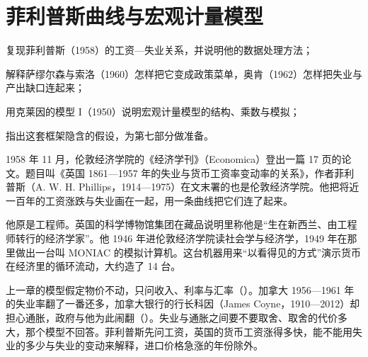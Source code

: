 \chapter{菲利普斯曲线与宏观计量模型}\label{ch:phillips}

\begin{chapterguide}
\begin{guidegoals}
\item 复现菲利普斯（1958）的工资—失业关系，并说明他的数据处理方法；
\item 解释萨缪尔森与索洛（1960）怎样把它变成政策菜单，奥肯（1962）怎样把失业与产出缺口连起来；
\item 用克莱因的模型 I（1950）说明宏观计量模型的结构、乘数与模拟；
\item 指出这套框架隐含的假设，为第七部分做准备。
\end{guidegoals}
\end{chapterguide}

1958 年 11 月，伦敦经济学院的《经济学刊》（Economica）登出一篇 17 页的论文\cite{phillips1958}。题目叫《英国 1861—1957 年的失业与货币工资率变动率的关系》，作者菲利普斯（A. W. H. Phillips，1914—1975）在文末署的也是伦敦经济学院\cite{phillips1958,loc38}。他把将近一百年的工资涨跌与失业画在一起，用一条曲线把它们连了起来\cite{phillips1958}。

他原是工程师。英国的科学博物馆集团在藏品说明里称他是“生在新西兰、由工程师转行的经济学家”\cite{smg38}。他 1946 年进伦敦经济学院读社会学与经济学，1949 年在那里做出一台叫 MONIAC 的模拟计算机\cite{smg38}。这台机器用来“以看得见的方式”演示货币在经济里的循环流动，大约造了 14 台\cite{smg38}。

上一章的模型假定物价不动，只问收入、利率与汇率（）。加拿大 1956—1961 年的失业率翻了一番还多，加拿大银行的行长科因（James Coyne，1910—2012）却担心通胀，政府与他为此闹翻（）\cite{gnd38}。失业与通胀之间要不要取舍、取舍的代价多大，那个模型不回答。菲利普斯先问工资，英国的货币工资涨得多快，能不能用失业的多少与失业的变动来解释，进口价格急涨的年份除外\cite{phillips1958}。

